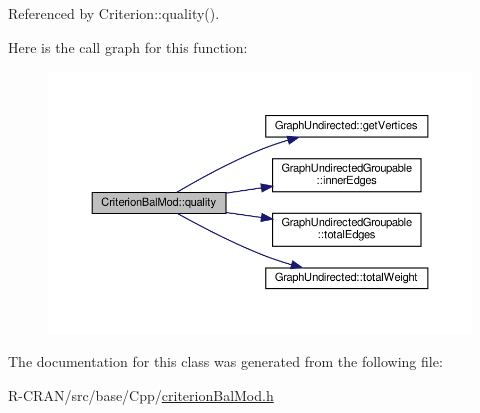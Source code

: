 Referenced by Criterion\+::quality().

Here is the call graph for this function\+:
\nopagebreak
\begin{figure}[H]
\begin{center}
\leavevmode
\includegraphics[width=350pt]{classCriterionBalMod_a87c0ccb5e2a851420dc82bd23cc31716_cgraph}
\end{center}
\end{figure}


The documentation for this class was generated from the following file\+:\begin{DoxyCompactItemize}
\item 
R-\/\+C\+R\+A\+N/src/base/\+Cpp/\hyperlink{criterionBalMod_8h}{criterion\+Bal\+Mod.\+h}\end{DoxyCompactItemize}
